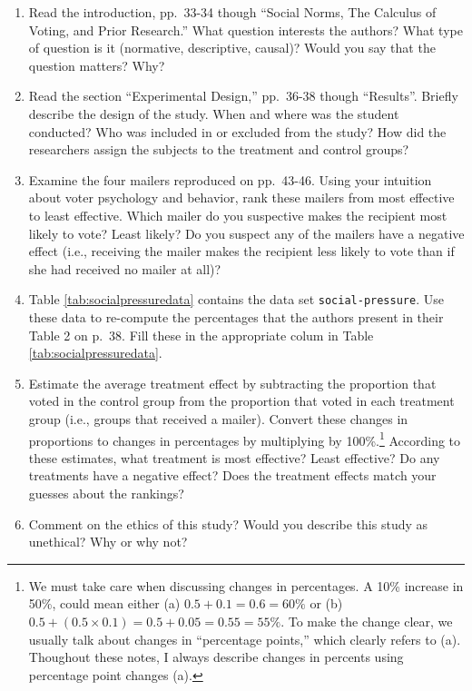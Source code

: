 \documentclass[]{book}
\providecommand{\tightlist}{%
  \setlength{\itemsep}{0pt}\setlength{\parskip}{0pt}}
\let\rmarkdownfootnote\footnote%
\def\footnote{\protect\rmarkdownfootnote}
\theoremstyle{definition}
\theoremstyle{definition}
\theoremstyle{definition}
\theoremstyle{remark}
\begin{document}
\begin{enumerate}
  \begin{enumerate}
  \def\labelenumii{\alph{enumii}.}
  \tightlist
  \item
    Read the introduction, pp.~33-34 though ``Social Norms, The Calculus
    of Voting, and Prior Research.'' What question interests the
    authors? What type of question is it (normative, descriptive,
    causal)? Would you say that the question matters? Why?
  \item
    Read the section ``Experimental Design,'' pp.~36-38 though
    ``Results''. Briefly describe the design of the study. When and
    where was the student conducted? Who was included in or excluded
    from the study? How did the researchers assign the subjects to the
    treatment and control groups?
  \item
    Examine the four mailers reproduced on pp.~43-46. Using your
    intuition about voter psychology and behavior, rank these mailers
    from most effective to least effective. Which mailer do you
    suspective makes the recipient most likely to vote? Least likely? Do
    you suspect any of the mailers have a negative effect (i.e.,
    receiving the mailer makes the recipient less likely to vote than if
    she had received no mailer at all)?
  \item
    Table \ref{tab:socialpressuredata} contains the data set
    \texttt{social-pressure}. Use these data to re-compute the
    percentages that the authors present in their Table 2 on p.~38. Fill
    these in the appropriate colum in Table
    \ref{tab:socialpressuredata}.
  \item
    Estimate the average treatment effect by subtracting the proportion
    that voted in the control group from the proportion that voted in
    each treatment group (i.e., groups that received a mailer). Convert
    these changes in proportions to changes in percentages by
    multiplying by 100\%.\footnote{We must take care when discussing
      changes in percentages. A 10\% increase in 50\%, could mean either
      (a) \(0.5 + 0.1 = 0.6 = 60\%\) or (b)
      \(0.5 + (0.5 \times 0.1) = 0.5 + 0.05 = 0.55 = 55\%\). To make the
      change clear, we usually talk about changes in ``percentage
      points,'' which clearly refers to (a). Thoughout these notes, I
      always describe changes in percents using percentage point changes
      (a).} According to these estimates, what treatment is most
    effective? Least effective? Do any treatments have a negative
    effect? Does the treatment effects match your guesses about the
    rankings?
  \item
    Comment on the ethics of this study? Would you describe this study
    as unethical? Why or why not?
  \end{enumerate}


\end{enumerate}
\end{document}
